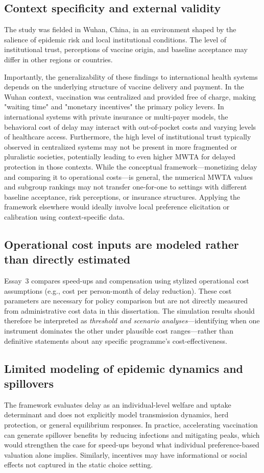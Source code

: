 \documentclass[doublespacing]{utdthesis}
\begin{document}
\subsection{Context specificity and external validity}
The study was fielded in Wuhan, China, in an environment shaped by the salience of epidemic risk and local institutional conditions. The level of institutional trust, perceptions of vaccine origin, and baseline acceptance may differ in other regions or countries.

Importantly, the generalizability of these findings to international health systems depends on the underlying structure of vaccine delivery and payment. In the Wuhan context, vaccination was centralized and provided free of charge, making "waiting time" and "monetary incentives" the primary policy levers. In international systems with private insurance or multi-payer models, the behavioral cost of delay may interact with out-of-pocket costs and varying levels of healthcare access. Furthermore, the high level of institutional trust typically observed in centralized systems may not be present in more fragmented or pluralistic societies, potentially leading to even higher MWTA for delayed protection in those contexts. While the conceptual framework—monetizing delay and comparing it to operational costs—is general, the numerical MWTA values and subgroup rankings may not transfer one-for-one to settings with different baseline acceptance, risk perceptions, or insurance structures. Applying the framework elsewhere would ideally involve local preference elicitation or calibration using context-specific data.

\subsection{Operational cost inputs are modeled rather than directly estimated}
Essay~3 compares speed-ups and compensation using stylized operational cost assumptions (e.g., cost per person-month of delay reduction). These cost parameters are necessary for policy comparison but are not directly measured from administrative cost data in this dissertation. The simulation results should therefore be interpreted as \emph{threshold and scenario analyses}—identifying when one instrument dominates the other under plausible cost ranges—rather than definitive statements about any specific programme’s cost-effectiveness.

\subsection{Limited modeling of epidemic dynamics and spillovers}
The framework evaluates delay as an individual-level welfare and uptake determinant and does not explicitly model transmission dynamics, herd protection, or general equilibrium responses. In practice, accelerating vaccination can generate spillover benefits by reducing infections and mitigating peaks, which would strengthen the case for speed-ups beyond what individual preference-based valuation alone implies. Similarly, incentives may have informational or social effects not captured in the static choice setting.
\end{document}
